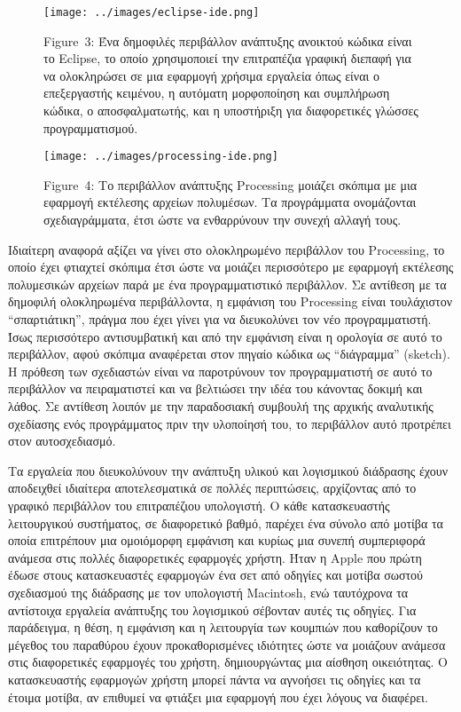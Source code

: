 \documentclass[
]{article}
\begin{document}
\leavevmode{}%
\begin{figure}
\hypertarget{fig:eclipse-ide}{%
\centering
\texttt{[image: ../images/eclipse-ide.png]}
\caption{Figure~3: Ένα δημοφιλές περιβάλλον ανάπτυξης ανοικτού κώδικα
είναι το Eclipse, το οποίο χρησιμοποιεί την επιτραπέζια γραφική διεπαφή
για να ολοκληρώσει σε μια εφαρμογή χρήσιμα εργαλεία όπως είναι ο
επεξεργαστής κειμένου, η αυτόματη μορφοποίηση και συμπλήρωση κώδικα, ο
αποσφαλματωτής, και η υποστήριξη για διαφορετικές γλώσσες
προγραμματισμού.}\label{fig:eclipse-ide}
}
\end{figure}

\leavevmode{}%
\begin{figure}
\hypertarget{fig:processing-ide}{%
\centering
\texttt{[image: ../images/processing-ide.png]}
\caption{Figure~4: Το περιβάλλον ανάπτυξης Processing μοιάζει σκόπιμα με
μια εφαρμογή εκτέλεσης αρχείων πολυμέσων. Τα προγράμματα ονομάζονται
σχεδιαγράμματα, έτσι ώστε να ενθαρρύνουν την συνεχή αλλαγή
τους.}\label{fig:processing-ide}
}
\end{figure}

Ιδιαίτερη αναφορά αξίζει να γίνει στο ολοκληρωμένο περιβάλλον του
Processing, το οποίο έχει φτιαχτεί σκόπιμα έτσι ώστε να μοιάζει
περισσότερο με εφαρμογή εκτέλεσης πολυμεσικών αρχείων παρά με ένα
προγραμματιστικό περιβάλλον. Σε αντίθεση με τα δημοφιλή ολοκληρωμένα
περιβάλλοντα, η εμφάνιση του Processing είναι τουλάχιστον
``σπαρτιάτικη'', πράγμα που έχει γίνει για να διευκολύνει τον νέο
προγραμματιστή. Ίσως περισσότερο αντισυμβατική και από την εμφάνιση
είναι η ορολογία σε αυτό το περιβάλλον, αφού σκόπιμα αναφέρεται στον
πηγαίο κώδικα ως ``διάγραμμα'' (sketch). Η πρόθεση των σχεδιαστών είναι
να παροτρύνουν τον προγραμματιστή σε αυτό το περιβάλλον να πειραματιστεί
και να βελτιώσει την ιδέα του κάνοντας δοκιμή και λάθος. Σε αντίθεση
λοιπόν με την παραδοσιακή συμβουλή της αρχικής αναλυτικής σχεδίασης ενός
προγράμματος πριν την υλοποίησή του, το περιβάλλον αυτό προτρέπει στον
αυτοσχεδιασμό.

Τα εργαλεία που διευκολύνουν την ανάπτυξη υλικού και λογισμικού
διάδρασης έχουν αποδειχθεί ιδιαίτερα αποτελεσματικά σε πολλές
περιπτώσεις, αρχίζοντας από το γραφικό περιβάλλον του επιτραπέζιου
υπολογιστή. Ο κάθε κατασκευαστής λειτουργικού συστήματος, σε διαφορετικό
βαθμό, παρέχει ένα σύνολο από μοτίβα τα οποία επιτρέπουν μια ομοιόμορφη
εμφάνιση και κυρίως μια συνεπή συμπεριφορά ανάμεσα στις πολλές
διαφορετικές εφαρμογές χρήστη. Ήταν η Apple που πρώτη έδωσε στους
κατασκευαστές εφαρμογών ένα σετ από οδηγίες και μοτίβα σωστού σχεδιασμού
της διάδρασης με τον υπολογιστή Macintosh, ενώ ταυτόχρονα τα αντίστοιχα
εργαλεία ανάπτυξης του λογισμικού σέβονταν αυτές τις οδηγίες. Για
παράδειγμα, η θέση, η εμφάνιση και η λειτουργία των κουμπιών που
καθορίζουν το μέγεθος του παραθύρου έχουν προκαθορισμένες ιδιότητες ώστε
να μοιάζουν ανάμεσα στις διαφορετικές εφαρμογές του χρήστη,
δημιουργώντας μια αίσθηση οικειότητας. Ο κατασκευαστής εφαρμογών χρήστη
μπορεί πάντα να αγνοήσει τις οδηγίες και τα έτοιμα μοτίβα, αν επιθυμεί
να φτιάξει μια εφαρμογή που έχει λόγους να διαφέρει.
\end{document}
